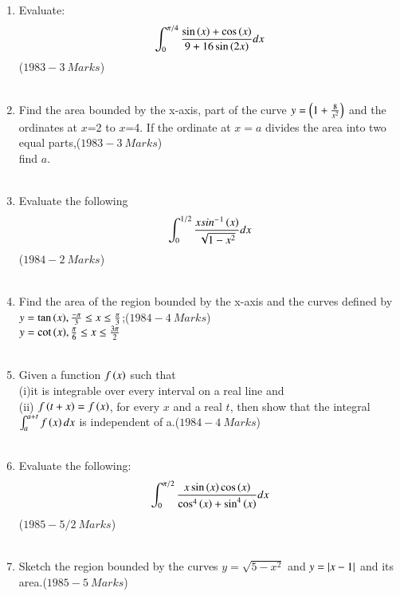 \documentclass[journal,12pt,twocolumn]{IEEEtran}
\theoremstyle{remark}
\begin{document}
\begin{enumerate}
    \item Evaluate:\begin{align*}
         \int_{0}^{\pi/4}\frac{\sin{\ensuremath{\left(x\right)}}+\cos{\ensuremath{\left(x\right)}}}{9+16\sin{\ensuremath{\left(2x\right)}}}dx\end{align*} \hfill($1983-3\ Marks$)\\\\
	 \item Find the area bounded by the x-axis, part of the curve $y=\left(1+\frac{8}{x^2}\right)$ and the ordinates at $x$=2 to $x$=4. If the ordinate at $x=a$ divides the area into two equal parts,\hfill($1983-3\ Marks$)\\find $a$.\\\\
	 \item Evaluate the following\begin{align*}
	     \int_{0}^{1/2}\frac{xsin^-{}^1\left(x\right)}{\sqrt{1-x^2}}dx
	     \end{align*}\hfill($1984-2\ Marks$)\\\\
	     \item Find the area of the region bounded by the x-axis and the curves defined by $y=\tan{\ensuremath{\left(x\right)}}, \frac{-\pi}{3}\leq x \leq\frac{\pi}{3}$;\hfill($1984-4\ Marks$)\\$y=\cot{\ensuremath{\left(x\right)}}, \frac{\pi}{6}\leq x \leq\frac{3\pi}{2}$\\\\
	     \item Given a function $f\left(x\right)$ such that\\(i)it is integrable over every interval on a real line and\\(ii) $f\left(t+x\right)=f\left(x\right)$, for every $x$ and a real $t$, then show that the integral$\int_{a}^{a+t}f\left(x\right) dx$ is independent of a.\hfill($1984-4\ Marks$)\\\\
	     \item Evaluate the following:\begin{align*}
	         \int_{0}^{\pi/2}\frac{x\sin{\ensuremath{\left(x
		     \right)}}\cos{\ensuremath{\left(x\right)}}}{\cos^4{\left(x\right)}+\sin^4{\left(x\right)}}dx
		     \end{align*}\hfill($1985-5/2\ Marks$)\\\\
		     \item Sketch the region bounded by the curves $y=\sqrt{5-x^2}$ and $y=\left\vert x-1\right\vert$ and its\\ area.\hfill($1985-5\ Marks$)\\\\

\end{enumerate}
\end{document}
